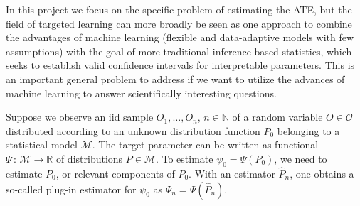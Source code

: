 \documentclass{article}
\newcommand{\EE}{\mathbb{E}}
\newcommand{\R}{\mathbb{R}}
\newcommand{\1}{\mathbb{1}}
\begin{document}

In this project we focus on the specific problem of estimating the ATE, but the field of targeted
learning can more broadly be seen as one approach to combine the advantages of machine learning
(flexible and data-adaptive models with few assumptions) with the goal of more traditional inference
based statistics, which seeks to establish valid confidence intervals for interpretable parameters.
This is an important general problem to address if we want to utilize the advances of machine
learning to answer scientifically interesting questions.

\iffalse Suppose we observe an iid sample \(O_1,\ldots,O_n\),
\(n\in\mathbb{N}\) of a random variable \(O \in\mathcal{O}\)
distributed according to an unknown distribution function \(P_0\)
belonging to a statistical model \(\mathcal{M}\). The target parameter
can be written as functional
\(\Psi \, : \, \mathcal{M} \rightarrow \R\) of distributions
\(P\in\mathcal{M}\). To estimate \(\psi_0 = \Psi(P_0)\), we need to
estimate \(P_0\), or relevant components of \(P_0\).  With an
estimator \(\hat{P}_n\), one obtains a so-called plug-in estimator for
\(\psi_0\) as \(\hat{\Psi}_n = \Psi( \hat{P}_n)\).
\end{document}
